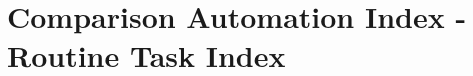 \documentclass[11pt,a4paper,fleqn]{article}
\newcommand*{\myalign}[2]{\multicolumn{1}{#1}{#2}} %
\begin{document}
\begin{comment}
\begin{table}
\begin{small}
  \begin{threeparttable}
    \caption{{\normalsize Examples of matched industries with patents, 2001}}
    \label{table:industry_linked2matches2001}
     \begin{tabular}{llr}
        \toprule
        \textbf{NAICS} & \textbf{Industry name} & \textbf{Number matches}  \tabularnewline
        \midrule
        334413	& Semiconductor and Related Device Manufacturing  & 6'867							\tabularnewline
        511219 	& Other Computer Related Services$^1$				& 6'418									\tabularnewline
        541512 	& Computer Systems Design Services				& 5'692									\tabularnewline
        \myalign{c}{\vdots}	& \myalign{c}{\vdots}			& 		\myalign{r}{\vdots}							\tabularnewline
        3335 	& Motor Vehicle Parts Manufacturing				& 2									\tabularnewline
        3363 	& Metalworking Machinery Manufacturing				& 1									\tabularnewline
        \myalign{c}{\vdots}	& \myalign{c}{\vdots}			& 		\myalign{r}{\vdots}							\tabularnewline
        3112 	& Grain and Oilseed Milling				& 0									\tabularnewline
        \myalign{c}{\vdots}	& \myalign{c}{\vdots}			& 		\myalign{r}{\vdots}							\tabularnewline
        \midrule
        	& Mean matches per industry  & 200.1							\tabularnewline
        	& Total matches linked to industries  & 94'046							\tabularnewline
        	& Total number of matches  & 231'514							\tabularnewline
        	& Share of matches linked to industries  & 41\%							\tabularnewline
        	& Total number of patents identified  & 184'172							\tabularnewline
        \bottomrule
     \end{tabular}
    \begin{tablenotes}
      \footnotesize
      \item $^1$includes software installation services and computer disaster recovery services 
      \item 	\textit{Source:} USPTO, Google and own calculations.
          \end{tablenotes}
  \end{threeparttable}
\end{small}
\end{table}
\end{comment}

\section{Comparison Automation Index - Routine Task Index}
\end{document}
